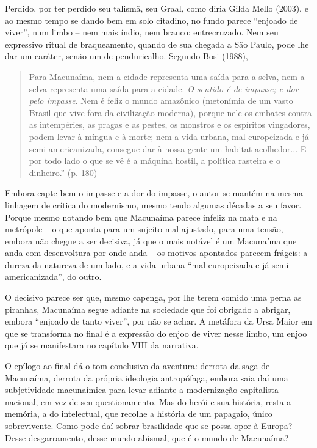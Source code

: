 Perdido, por ter perdido seu talismã, seu Graal, como diria Gilda Mello
(2003), e ao mesmo tempo se dando bem em solo citadino, no fundo parece
``enjoado de viver'', num limbo -- nem mais índio, nem branco:
entrecruzado. Nem seu expressivo ritual de braqueamento, quando de sua
chegada a São Paulo, pode lhe dar um caráter, senão um de penduricalho.
Segundo Bosi (1988),

\begin{quote}
Para Macunaíma, nem a cidade representa uma saída para a selva, nem a
selva representa uma saída para a cidade. \emph{O sentido é de impasse;
e dor pelo impasse}. Nem é feliz o mundo amazônico (metonímia de um
vasto Brasil que vive fora da civilização moderna), porque nele os
embates contra as intempéries, as pragas e as pestes, os monstros e os
espíritos vingadores, podem levar à míngua e à morte; nem a vida urbana,
mal europeizada e já semi-americanizada, consegue dar à nossa gente um
habitat acolhedor... E por todo lado o que se vê é a máquina hostil, a
política rasteira e o dinheiro.'' (p. 180)
\end{quote}

Embora capte bem o impasse e a dor do impasse, o autor se mantém na
mesma linhagem de crítica do modernismo, mesmo tendo algumas décadas a
seu favor. Porque mesmo notando bem que Macunaíma parece infeliz na mata
e na metrópole -- o que aponta para um sujeito mal-ajustado, para uma
tensão, embora não chegue a ser decisiva, já que o mais notável é um
Macunaíma que anda com desenvoltura por onde anda -- os motivos
apontados parecem frágeis: a dureza da natureza de um lado, e a vida
urbana ``mal europeizada e já semi-americanizada'', do outro.

O decisivo parece ser que, mesmo capenga, por lhe terem comido uma perna
as piranhas, Macunaíma segue adiante na sociedade que foi obrigado a
abrigar, embora ``enjoado de tanto viver'', por não se achar. A metáfora
da Ursa Maior em que se transforma no final é a expressão do enjoo de
viver nesse limbo, um enjoo que já se manifestara no capítulo VIII da
narrativa.

O epílogo ao final dá o tom conclusivo da aventura: derrota da saga de
Macunaíma, derrota da própria ideologia antropófaga, embora saia daí uma
subjetividade macunaímica para levar adiante a modernização capitalista
nacional, em vez de seu questionamento. Mas do herói e sua história,
resta a memória, a do intelectual, que recolhe a história de um
papagaio, único sobrevivente. Como pode daí sobrar brasilidade que se
possa opor à Europa? Desse desgarramento, desse mundo abismal, que é o
mundo de Macunaíma?

